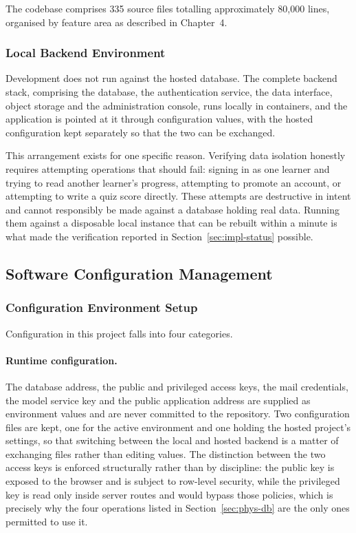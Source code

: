 \documentclass[12pt, oneside]{article} %
\begin{document}
The codebase comprises 335 source files totalling approximately 80,000 lines, organised by feature area as described in Chapter~4.

\subsubsection{Local Backend Environment}

Development does not run against the hosted database. The complete backend stack, comprising the database, the authentication service, the data interface, object storage and the administration console, runs locally in containers, and the application is pointed at it through configuration values, with the hosted configuration kept separately so that the two can be exchanged.

This arrangement exists for one specific reason. Verifying data isolation honestly requires attempting operations that should fail: signing in as one learner and trying to read another learner's progress, attempting to promote an account, or attempting to write a quiz score directly. These attempts are destructive in intent and cannot responsibly be made against a database holding real data. Running them against a disposable local instance that can be rebuilt within a minute is what made the verification reported in Section~\ref{sec:impl-status} possible.

\subsection{Software Configuration Management}
\label{sec:impl-scm}

\subsubsection{Configuration Environment Setup}

Configuration in this project falls into four categories.

\paragraph{Runtime configuration.} The database address, the public and privileged access keys, the mail credentials, the model service key and the public application address are supplied as environment values and are never committed to the repository. Two configuration files are kept, one for the active environment and one holding the hosted project's settings, so that switching between the local and hosted backend is a matter of exchanging files rather than editing values. The distinction between the two access keys is enforced structurally rather than by discipline: the public key is exposed to the browser and is subject to row-level security, while the privileged key is read only inside server routes and would bypass those policies, which is precisely why the four operations listed in Section~\ref{sec:phys-db} are the only ones permitted to use it.
\end{document}

